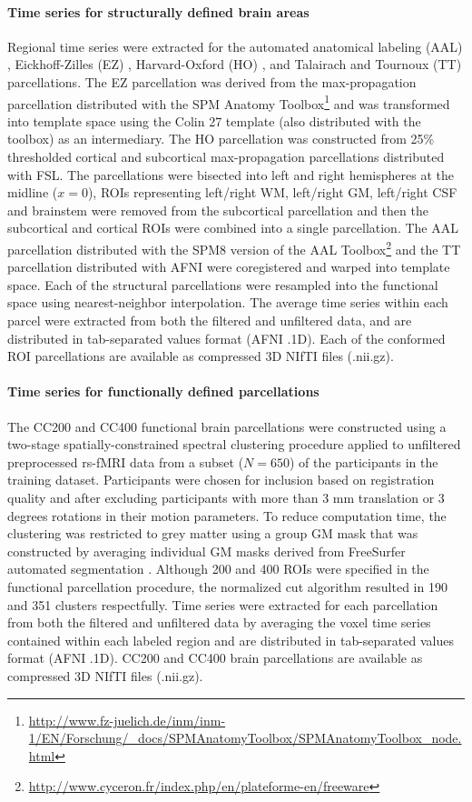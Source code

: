 \documentclass[preprint,12pt,3p]{elsarticle}
\begin{document}
\paragraph{Time series for structurally defined brain areas} Regional time series were extracted for the automated anatomical labeling (AAL) \cite{tzourio2002automated}, Eickhoff-Zilles (EZ) \cite{eickhoff2005new}, Harvard-Oxford (HO) \cite{HO_atlas_1, HO_atlas_2, HO_atlas_3, HO_atlas_4}, and Talairach and Tournoux (TT) \cite{lancaster2000automated} parcellations. The EZ parcellation was derived from the max-propagation parcellation distributed with the SPM Anatomy Toolbox\footnote{\url{http://www.fz-juelich.de/inm/inm-1/EN/Forschung/_docs/SPMAnatomyToolbox/SPMAnatomyToolbox_node.html}} and was transformed into template space using the Colin 27 template (also distributed with the toolbox) as an intermediary. The HO parcellation was constructed from 25\% thresholded cortical and subcortical max-propagation parcellations distributed with FSL. The parcellations were bisected into left and right hemispheres at the midline ($x=0$), ROIs representing left/right WM, left/right GM, left/right CSF and brainstem were removed from the subcortical parcellation and then the subcortical and cortical ROIs were combined into a single parcellation. The AAL parcellation distributed with the SPM8 version of the AAL Toolbox\footnote{\url{http://www.cyceron.fr/index.php/en/plateforme-en/freeware}} and the TT parcellation distributed with AFNI were coregistered and warped into template space. Each of the structural parcellations were resampled into the functional space using nearest-neighbor interpolation. The average time series within each parcel were extracted from both the filtered and unfiltered data, and are distributed in tab-separated values format (AFNI .1D). Each of the conformed ROI parcellations are available as compressed 3D NIfTI files (.nii.gz).

\paragraph{Time series for functionally defined parcellations} The CC200 and CC400 functional brain parcellations were constructed using a two-stage spatially-constrained spectral clustering procedure \cite{craddock2012whole} applied to unfiltered preprocessed rs-fMRI data from a subset ($N=650$) of the participants in the training dataset. Participants were chosen for inclusion based on registration quality and after excluding participants with more than 3 mm translation or 3 degrees rotations in their motion parameters. To reduce computation time, the clustering was restricted to grey matter using a group GM mask that was constructed by averaging individual GM masks derived from FreeSurfer automated segmentation \cite{dale1999freesurfer}. Although 200 and 400 ROIs were specified in the functional parcellation procedure, the normalized cut algorithm resulted in 190 and 351 clusters respectfully. Time series were extracted for each parcellation from both the filtered and unfiltered data by averaging the voxel time series contained within each labeled region and are distributed in tab-separated values format (AFNI .1D). CC200 and CC400 brain parcellations are available as compressed 3D NIfTI files (.nii.gz).
\end{document}
